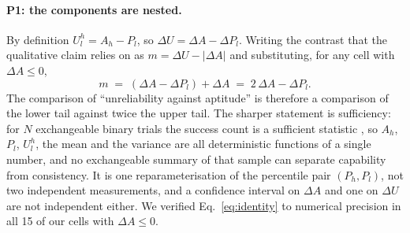 \documentclass{article}
\begin{document}
\paragraph{P1: the components are nested.} By definition $U^h_l = A_h - P_l$, so
$\Delta U = \Delta A - \Delta P_l$. Writing the contrast that the qualitative claim relies on as
$m = \Delta U - |\Delta A|$ and substituting, for any cell with $\Delta A \le 0$,
\begin{equation}
m \;=\; (\Delta A - \Delta P_l) + \Delta A \;=\; 2\,\Delta A - \Delta P_l .
\label{eq:identity}
\end{equation}
The comparison of ``unreliability against aptitude'' is therefore a comparison of the lower tail against twice the upper tail. The sharper statement is sufficiency: for $N$ exchangeable binary trials the success count is a sufficient statistic \citep{fisher1922mathematical}, so $A_h$, $P_l$, $U^h_l$, the mean and the variance are all deterministic functions of a single number, and no exchangeable summary of that sample can separate capability from consistency. It is one reparameterisation of the percentile pair
$(P_h, P_l)$, not two independent measurements, and a confidence interval on $\Delta A$ and one on
$\Delta U$ are not independent either. We verified Eq.~\ref{eq:identity} to numerical precision in
all 15 of our cells with $\Delta A \le 0$.
\end{document}
